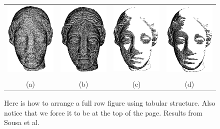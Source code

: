 \documentclass[accepted,single]{gipaper}
\begin{document}
\begin{figure}[t]
\centering
\begin{tabular} {cccc}
  \includegraphics[width=3.5cm]{figs/res/igea/a.png} &
  \includegraphics[width=3.5cm]{figs/res/igea/b.png} &
  \includegraphics[width=3.5cm]{figs/res/igea/c.png} &
  \includegraphics[width=3.5cm]{figs/res/igea/d.png} \\ \\
(a) & (b) & (c) & (d) \\
\end{tabular}
\caption{Here is how to arrange a full row figure using tabular
structure. Also notice that we force it to be at the top of the
page. Results from Sousa et al.~\cite{Sousa_etal_CGI:2004}}
\label{fossil-skull}
\end{figure}
\end{document}
